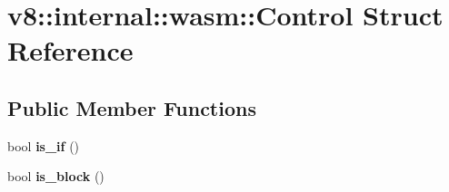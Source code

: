 \hypertarget{structv8_1_1internal_1_1wasm_1_1_control}{}\section{v8\+:\+:internal\+:\+:wasm\+:\+:Control Struct Reference}
\label{structv8_1_1internal_1_1wasm_1_1_control}
\subsection*{Public Member Functions}
\begin{DoxyCompactItemize}
\item 
bool {\bfseries is\+\_\+if} ()\hypertarget{structv8_1_1internal_1_1wasm_1_1_control_a621a823ad44e0006faa6abadd01dd677}{}\label{structv8_1_1internal_1_1wasm_1_1_control_a621a823ad44e0006faa6abadd01dd677}

\item 
bool {\bfseries is\+\_\+block} ()\hypertarget{structv8_1_1internal_1_1wasm_1_1_control_afcb81b1b26a233658c2af0917ffdb49c}{}\label{structv8_1_1internal_1_1wasm_1_1_control_afcb81b1b26a233658c2af0917ffdb49c}

\end{DoxyCompactItemize}
